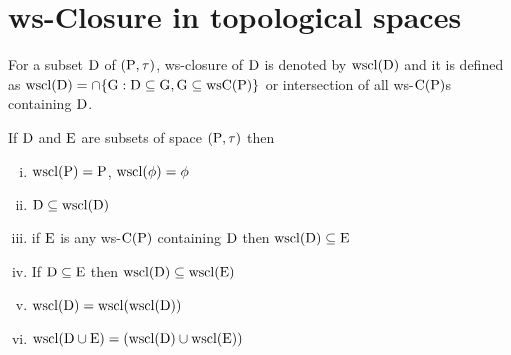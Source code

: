 \section{ws-Closure in topological spaces}\label{sec2.3}

\begin{dfn}\label{defi2.3.1} 
For a subset $\mathrm{D}$ of $(\mathrm{P}, \tau)$, ws-closure of $\mathrm{D}$ is denoted by $\mathrm{wscl}(\mathrm{D})$ and it is defined as $\mathrm{wscl}(\mathrm{D})=\cap \{\mathrm{G}: \mathrm{D}\subseteq \mathrm{G}, \mathrm{G}\subseteq \mathrm{ws}\mathrm{C}(\mathrm{P})\}$ or intersection of all ws-$\mathrm{C}(\mathrm{P})$s containing $\mathrm{D}$.
\end{dfn}

\begin{thm}\label{thm2.3.1}
If $\mathrm{D}$ and $\mathrm{E}$  are subsets of space $(\mathrm{P}, \tau)$ then
\begin{enumerate}[(i)]
\item $\mathrm{wscl}(\mathrm{P})=\mathrm{P}$, $\mathrm{wscl}(\phi)=\phi$
\item $\mathrm{D}\subseteq \mathrm{wscl}(\mathrm{D})$
\item if $\mathrm{E}$ is any ws-$\mathrm{C}(\mathrm{P})$ containing $\mathrm{D}$ then $\mathrm{wscl}(\mathrm{D})\subseteq \mathrm{E}$
\item If $\mathrm{D}\subseteq \mathrm{E}$ then $\mathrm{wscl}(\mathrm{D})\subseteq \mathrm{wscl}(\mathrm{E})$
\item $\mathrm{wscl}(\mathrm{D})=\mathrm{wscl}(\mathrm{wscl}(\mathrm{D}))$
\item $\mathrm{wscl}(\mathrm{D}\cup \mathrm{E})=(\mathrm{wscl}(\mathrm{D})\cup \mathrm{wscl}(\mathrm{E}))$
\end{enumerate}
\end{thm}

